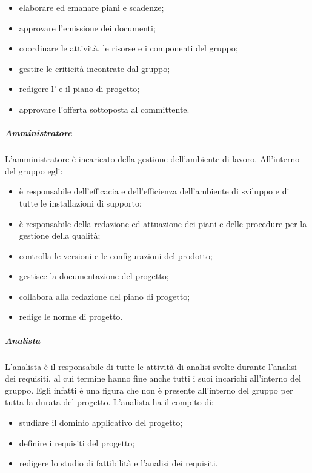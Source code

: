 			\begin{itemize}
				\item elaborare ed emanare piani e scadenze;
				\item approvare l'emissione dei documenti;
				\item coordinare le attività, le risorse e i componenti del gruppo;
				\item gestire le criticità incontrate dal gruppo;
				\item redigere l' e il piano di progetto;
				\item approvare l'offerta sottoposta al committente.
			\end{itemize}

		\subparagraph{Amministratore}

			L'amministratore è incaricato della gestione dell'ambiente di lavoro.
			\newline
			All'interno del gruppo egli:

			\begin{itemize}
				\item è responsabile dell'efficacia e dell'efficienza dell'ambiente di sviluppo e di tutte le installazioni di supporto;
				\item è responsabile della redazione ed attuazione dei piani e delle procedure per la gestione della qualità;
				\item controlla le versioni e le configurazioni del prodotto;
				\item gestisce la documentazione del progetto;
				\item collabora alla redazione del piano di progetto;
				\item redige le norme di progetto.
			\end{itemize}

		\subparagraph{Analista}
			L'analista è il responsabile di tutte le attività di analisi svolte durante l'analisi dei requisiti, al cui termine hanno fine anche tutti i suoi incarichi all'interno del gruppo. Egli infatti è una figura che non è presente all'interno del gruppo per tutta la durata del progetto.
			\newline
			L'analista ha il compito di:

			\begin{itemize}
				\item studiare il dominio applicativo del progetto;
				\item definire i requisiti del progetto;
				\item redigere lo studio di fattibilità e l'analisi dei requisiti.
			\end{itemize}

